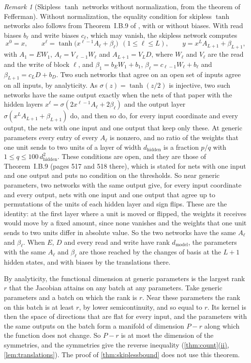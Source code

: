 \documentclass[10pt]{article}
\theoremstyle{definition}
\theoremstyle{remark}
\newtheorem*{remark*}{Remark}
\newcommand{\dm}{d_{\mathrm{model}}}
\newcommand{\dhid}{d_{\mathrm{hidden}}}
\DeclareRobustCommand{\cpref}[2]{\hyperref[#1:#2]{\cref*{#1}(#2)}}
\begin{document}
\begin{remark*}[Skipless $\tanh$ networks without normalization, from the theorem of Fefferman]
Without normalization, the equality condition for skipless $\tanh$ networks also follows from Theorem~I.B.9 of \citet{fefferman1994}, with or without biases. With read biases $b_\ell$ and write biases $c_\ell$, which may vanish, the skipless network computes
\[
x^0 = x,\qquad x^\ell = \tanh\big(x^{\ell-1}A_\ell + \beta_\ell\big)\ \ (1 \le \ell \le L),\qquad y = x^LA_{L+1} + \beta_{L+1},
\]
with $A_1 = EW_1$, $A_\ell = V_{\ell-1}W_\ell$ and $A_{L+1} = V_LD$, where $W_\ell$ and $V_\ell$ are the read and the write of block $\ell$, and $\beta_1 = b_EW_1 + b_1$, $\beta_\ell = c_{\ell-1}W_\ell + b_\ell$ and $\beta_{L+1} = c_LD + b_D$. Two such networks that agree on an open set of inputs agree on all inputs, by analyticity. As $\sigma(z) = \tanh(z/2)$ is injective, two such networks have the same output exactly when the nets of that paper with the hidden layers $x^\ell = \sigma(2x^{\ell-1}A_\ell + 2\beta_\ell)$ and the output layer $\sigma(x^LA_{L+1} + \beta_{L+1})$ do, and then so do, for every input coordinate and every output, the nets with one input and one output that keep only these. At generic parameters every entry of every $A_\ell$ is nonzero, and no ratio of the weights that one unit sends to two units of a layer of width $\dhid$ is a fraction $p/q$ with $1 \le q \le 100\,\dhid^2$. These conditions are open, and they are those of Theorem~I.B.9 (pages 517 and 518 there), which is stated for nets with one input and one output and puts no condition on the thresholds. So near generic parameters, two networks with the same output give, for every input coordinate and every output, nets with one input and one output that agree up to permutations of the units of each hidden layer and sign flips. These are the identity: at the first layer where a unit is moved or flipped, the weights it receives would move by a fixed amount, since none vanishes and the weights that one unit sends to two units differ in absolute value. So the two networks have the same $A_\ell$ and $\beta_\ell$. When $E$, $D$ and every read and write have rank $\dm$, the parameters with the same $A_\ell$ and $\beta_\ell$ are those reached by the changes of basis at the $L+1$ hidden states, and with biases by the translations there.

By analyticity, the functional dimension at generic parameters is the largest rank $r$ that the Jacobian attains on any batch at any parameters. Take generic parameters and a batch on which the rank is $r$. Near these parameters the rank on this batch is at least $r$, by lower semicontinuity, and so equal to $r$. Its kernel is then the space of directions that are flat for every input, and the parameters with the same outputs on the batch form a manifold of dimension $P - r$ along which the function does not change. So $P - r$ is at most the dimension of the symmetries, and the symmetries give the reverse inequality (\cpref{thm:count}{ii}, \cref{lem:translations}). The proof of \cref{thm:skiplessbound} does not use this theorem.
\end{remark*}
\end{document}
